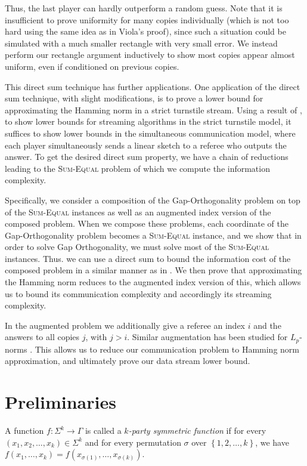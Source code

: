 \documentclass{toc}
\newcommand{\set}[1]{{\left \{{#1} \right \}}}
\newcommand{\alphabet}{\ensuremath{\Sigma}}
\newcommand{\range}{\ensuremath{\Gamma}}
\newcommand{\sumequal}{\textsc{Sum-Equal} }
\begin{document}
Thus, the last player can hardly outperform a random guess. 
Note that it is insufficient to prove uniformity for many copies individually 
(which is not too hard using the same idea as in Viola's proof), 
since such a situation could be simulated with a much smaller rectangle 
with very small error.
We instead perform our rectangle argument inductively to show most 
copies appear almost uniform, even if conditioned on previous copies. 


This direct sum technique has further applications. One application {\color{black} of the direct sum technique, with slight modifications,}
is to prove a lower bound for approximating the Hamming norm 
in a strict turnstile stream. 
Using a result of \cite{AHLW16}, to show lower bounds for streaming algorithms in the
strict turnstile model, it suffices to show lower bounds in the simultaneous communication model, where each player simultaneously sends a linear sketch to a referee who outputs the answer. 
To get the desired direct sum property, we have a chain of reductions leading to the \sumequal problem
%
of which we compute the information complexity.  %

Specifically, we consider a composition of the Gap-Orthogonality problem on top of the \sumequal instances as well as an augmented index version of the composed problem. When we compose these problems, each coordinate of the Gap-Orthogonality problem becomes a \sumequal instance, and we show that in order to solve Gap Orthogonality, we must solve most of the \sumequal instances. Thus. we can use a direct sum to bound the information cost of the composed problem in a similar manner as in \cite{wz12}. We then prove that approximating the Hamming norm reduces to the augmented index version of this, which allows us to bound its communication complexity and accordingly its streaming complexity.

In the augmented problem 
we additionally give a referee an index $i$ and the answers to all copies $j$, with $j > i$. 
Similar augmentation has been studied for $L_p$-norms \cite{knw10b}. 
This allows us to reduce our communication problem to Hamming norm approximation, and ultimately prove our data stream lower bound. 


%
%
\section{Preliminaries}
\label{sec:pre}


A function $f:\alphabet^k \to \range$ is called a \emph{$k$-party symmetric function} if for every $(x_1,x_2,\dots,x_k)\in \alphabet^k$ and for every permutation $\sigma$ over $\set{1,2,\dots,k}$,
we have 
$f(x_1,\dots,x_k) = f\left(x_{\sigma(1)},  \dots, x_{\sigma(k)}\right).$
\end{document}
